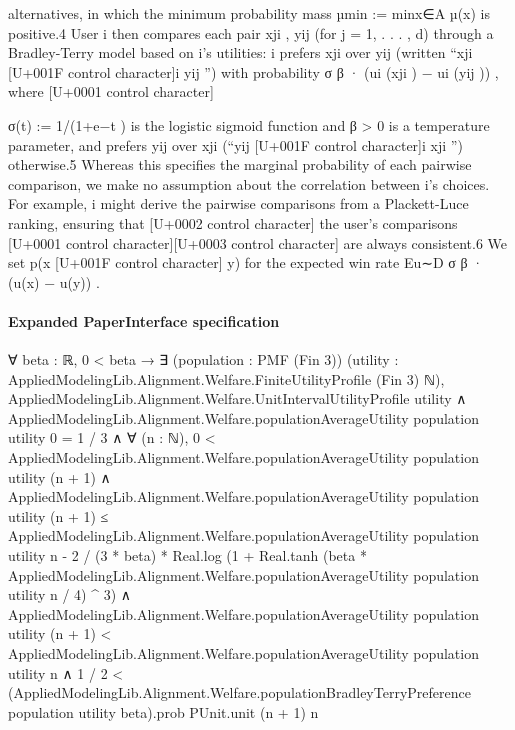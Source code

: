 \documentclass[10pt]{article}
\begin{document}
\begin{ReviewVerbatim}
alternatives, in which the minimum probability mass µmin := minx∈A µ(x) is positive.4 User i
then compares each pair {xji , yij } (for j = 1, . . . , d) through a Bradley-Terry model based on i’s
utilities: i prefers xji over yij (written “xji [U+001F control character]i yij ”) with probability σ β · (ui (xji ) − ui (yij )) , where
                                                                                                        [U+0001 control character]

σ(t) := 1/(1+e−t ) is the logistic sigmoid function and β > 0 is a temperature parameter, and prefers
yij over xji (“yij [U+001F control character]i xji ”) otherwise.5 Whereas this specifies the marginal probability of each pairwise
comparison, we make no assumption about the correlation between i’s choices. For example, i might
derive the pairwise comparisons from a Plackett-Luce ranking, ensuring that      [U+0002 control character] the user’s comparisons  [U+0001 control character][U+0003 control character]
are always consistent.6 We set p(x [U+001F control character] y) for the expected win rate Eu∼D σ β · (u(x) − u(y)) .
\end{ReviewVerbatim}



\paragraph{Expanded PaperInterface specification}
\begin{ReviewVerbatim}
∀ {beta : ℝ},
  0 < beta →
    ∃ (population : PMF (Fin 3)) (utility : AppliedModelingLib.Alignment.Welfare.FiniteUtilityProfile (Fin 3) ℕ),
      AppliedModelingLib.Alignment.Welfare.UnitIntervalUtilityProfile utility ∧
        AppliedModelingLib.Alignment.Welfare.populationAverageUtility population utility 0 = 1 / 3 ∧
          ∀ (n : ℕ),
            0 < AppliedModelingLib.Alignment.Welfare.populationAverageUtility population utility (n + 1) ∧
              AppliedModelingLib.Alignment.Welfare.populationAverageUtility population utility (n + 1) ≤
                  AppliedModelingLib.Alignment.Welfare.populationAverageUtility population utility n -
                    2 / (3 * beta) *
                      Real.log
                        (1 +
                          Real.tanh
                              (beta *
                                  AppliedModelingLib.Alignment.Welfare.populationAverageUtility population utility n /
                                4) ^
                            3) ∧
                AppliedModelingLib.Alignment.Welfare.populationAverageUtility population utility (n + 1) <
                    AppliedModelingLib.Alignment.Welfare.populationAverageUtility population utility n ∧
                  1 / 2 <
                    (AppliedModelingLib.Alignment.Welfare.populationBradleyTerryPreference population utility beta).prob
                      PUnit.unit (n + 1) n
\end{ReviewVerbatim}
\end{document}
